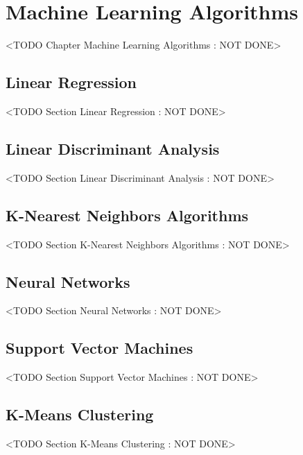 \chapter{Machine Learning Algorithms}
	<TODO Chapter Machine Learning Algorithms : NOT DONE>

\section{Linear Regression}
	<TODO Section Linear Regression : NOT DONE>

\section{Linear Discriminant Analysis}
	<TODO Section Linear Discriminant Analysis : NOT DONE>

\section{K-Nearest Neighbors Algorithms}
	<TODO Section K-Nearest Neighbors Algorithms : NOT DONE>

\section{Neural Networks}
	<TODO Section Neural Networks : NOT DONE>

\section{Support Vector Machines}
	<TODO Section Support Vector Machines : NOT DONE>

\section{K-Means Clustering}
	<TODO Section K-Means Clustering : NOT DONE>


